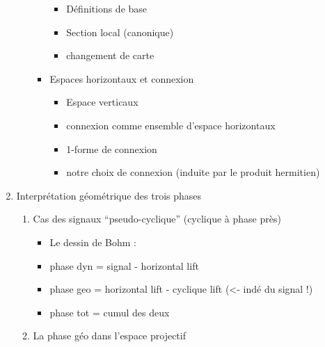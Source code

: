 \begin{enumerate}[label=\Roman* --- ]
\begin{enumerate}[label=\arabic{enumi}.\arabic* --- ]
\begin{itemize}
\begin{itemize}
				\item Définitions de base
				
				\item Section local (canonique)
				
				\item changement de carte
				
			\end{itemize}
			
			\item Espaces horizontaux et connexion
			\begin{itemize} \normalfont
				
				\item Espace verticaux
				
				\item connexion comme ensemble d'espace horizontaux
				
				\item 1-forme de connexion
				
				\item notre choix de connexion (induite par le produit hermitien)
			\end{itemize}
			
		\end{itemize}
		
	\end{enumerate}
	
	\item Interprétation géométrique des trois phases
	\begin{enumerate}[label=\arabic{enumi}.\arabic* --- ]
		
		\item Cas des signaux ``pseudo-cyclique'' (cyclique à phase près)
 		\begin{itemize} \normalfont
			
			\item Le dessin de Bohm :
			
			\item phase dyn =  signal - horizontal lift
			
			\item phase geo = horizontal lift - cyclique lift (<- indé du signal !)
			
			\item phase tot = cumul des deux
		\end{itemize}
		
		\item La phase géo dans l'espace projectif
		\begin{itemize} \normalfont
			

\end{itemize}
\end{enumerate}
\end{enumerate}

